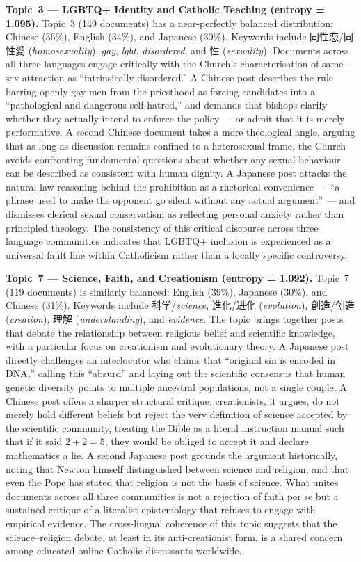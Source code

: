 \documentclass[../CLthesis.tex]{subfiles}
\begin{document}
\textbf{Topic~3 --- LGBTQ+ Identity and Catholic Teaching (entropy = 1.095).}
Topic~3 (149 documents) has a near-perfectly balanced distribution: Chinese (36\%), English (34\%), and Japanese (30\%). Keywords include 同性恋/同性愛 (\textit{homosexuality}), \textit{gay}, \textit{lgbt}, \textit{disordered}, and 性 (\textit{sexuality}). Documents across all three languages engage critically with the Church's characterisation of same-sex attraction as ``intrinsically disordered.'' A Chinese post describes the rule barring openly gay men from the priesthood as forcing candidates into a ``pathological and dangerous self-hatred,'' and demands that bishops clarify whether they actually intend to enforce the policy --- or admit that it is merely performative. A second Chinese document takes a more theological angle, arguing that as long as discussion remains confined to a heterosexual frame, the Church avoids confronting fundamental questions about whether any sexual behaviour can be described as consistent with human dignity. A Japanese post attacks the natural law reasoning behind the prohibition as a rhetorical convenience --- ``a phrase used to make the opponent go silent without any actual argument'' --- and dismisses clerical sexual conservatism as reflecting personal anxiety rather than principled theology. The consistency of this critical discourse across three language communities indicates that LGBTQ+ inclusion is experienced as a universal fault line within Catholicism rather than a locally specific controversy.

\textbf{Topic~7 --- Science, Faith, and Creationism (entropy = 1.092).}
Topic~7 (119 documents) is similarly balanced: English (39\%), Japanese (30\%), and Chinese (31\%). Keywords include 科学/\textit{science}, 進化/进化 (\textit{evolution}), 創造/创造 (\textit{creation}), 理解 (\textit{understanding}), and \textit{evidence}. The topic brings together posts that debate the relationship between religious belief and scientific knowledge, with a particular focus on creationism and evolutionary theory. A Japanese post directly challenges an interlocutor who claims that ``original sin is encoded in DNA,'' calling this ``absurd'' and laying out the scientific consensus that human genetic diversity points to multiple ancestral populations, not a single couple. A Chinese post offers a sharper structural critique: creationists, it argues, do not merely hold different beliefs but reject the very definition of science accepted by the scientific community, treating the Bible as a literal instruction manual such that if it said $2+2=5$, they would be obliged to accept it and declare mathematics a lie. A second Japanese post grounds the argument historically, noting that Newton himself distinguished between science and religion, and that even the Pope has stated that religion is not the basis of science. What unites documents across all three communities is not a rejection of faith per se but a sustained critique of a literalist epistemology that refuses to engage with empirical evidence. The cross-lingual coherence of this topic suggests that the science--religion debate, at least in its anti-creationist form, is a shared concern among educated online Catholic discussants worldwide.
\end{document}

